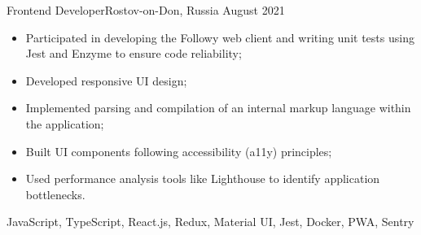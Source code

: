 
\begin{experiences}
   {Frontend Developer}{}{Rostov-on-Don, Russia}
    {August 2021}  {
                     \begin{itemize}
                     \item Participated in developing the Followy web client and writing unit tests using Jest and Enzyme to ensure code reliability;
                     \item Developed responsive UI design;
                     \item Implemented parsing and compilation of an internal markup language within the application;
                     \item Built UI components following accessibility (a11y) principles;
                     \item Used performance analysis tools like Lighthouse to identify application bottlenecks.
                     \end{itemize}
                  }
                  {JavaScript, TypeScript, React.js, Redux, Material UI, Jest, Docker, PWA, Sentry}
\end{experiences}
